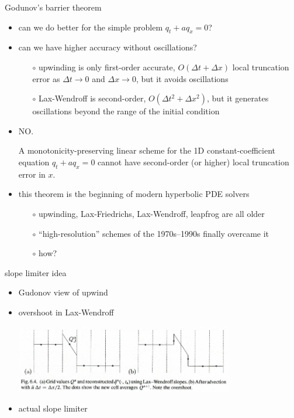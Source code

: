 \documentclass[10pt,hyperref]{beamer}
\begin{document}
\begin{frame}{Godunov's barrier theorem}

\begin{itemize}
\item can we do better for the simple problem $q_t + a q_x=0$?
\item can we have higher accuracy without oscillations?
    \begin{itemize}
    \item[$\circ$] upwinding is only first-order accurate, $O(\Delta t + \Delta x)$ local truncation error as $\Delta t\to 0$ and $\Delta x \to 0$, but it avoids oscillations
    \item[$\circ$] Lax-Wendroff is second-order, $O(\Delta t^2 + \Delta x^2)$, but it generates oscillations beyond the range of the initial condition
    \end{itemize}
\item \alert{NO.}

\begin{theorem}  A monotonicity-preserving \alert<2>{linear} scheme for the 1D constant-coefficient equation $q_t + a q_x=0$ cannot have second-order (or higher) local truncation error in $x$.\end{theorem}

\item this theorem is the beginning of modern hyperbolic PDE solvers
    \begin{itemize}
    \item[$\circ$] upwinding, Lax-Friedrichs, Lax-Wendroff, leapfrog are all older
    \item[$\circ$] ``high-resolution'' schemes of the 1970s--1990s finally overcame it
    \item[$\circ$] \alert{how?}
    \end{itemize}
\end{itemize}
\end{frame}


\begin{frame}{slope limiter idea}

\begin{itemize}
\item Gudonov view of upwind
\item overshoot in Lax-Wendroff

\hfill \includegraphics[width=0.75\textwidth]{figs/leveque6p4}
\item actual slope limiter
\end{itemize}
\end{frame}
\end{document}
